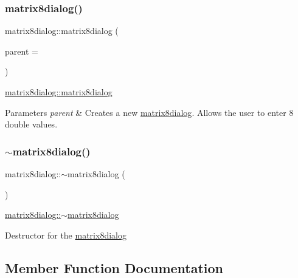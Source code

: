 \subsubsection{\texorpdfstring{matrix8dialog()}{matrix8dialog()}}
{\footnotesize\ttfamily matrix8dialog\+::matrix8dialog (\begin{DoxyParamCaption}\item[{Q\+Widget $\ast$}]{parent = {} }\end{DoxyParamCaption})\hspace{0.3cm}{\ttfamily [explicit]}}



\mbox{\hyperlink{classmatrix8dialog_afcdbf5b7f9fcef31cbd030cd130d57f9}{matrix8dialog\+::matrix8dialog}} 


\begin{DoxyParams}{Parameters}
{\em parent} & Creates a new \mbox{\hyperlink{classmatrix8dialog}{matrix8dialog}}. Allows the user to enter 8 double values. \\
\hline
\end{DoxyParams}
\mbox{\label{classmatrix8dialog_a2caefa9ac5a7cd24f3f7713f885fe792}} 
\subsubsection{\texorpdfstring{$\sim$matrix8dialog()}{~matrix8dialog()}}
{\footnotesize\ttfamily matrix8dialog\+::$\sim$matrix8dialog (\begin{DoxyParamCaption}{ }\end{DoxyParamCaption})}



\mbox{\hyperlink{classmatrix8dialog_a2caefa9ac5a7cd24f3f7713f885fe792}{matrix8dialog\+::$\sim$matrix8dialog}} 

Destructor for the \mbox{\hyperlink{classmatrix8dialog}{matrix8dialog}} 

\subsection{Member Function Documentation}
\mbox{\label{classmatrix8dialog_a74736300c5b1a4aa0291016991c7e508}} 
